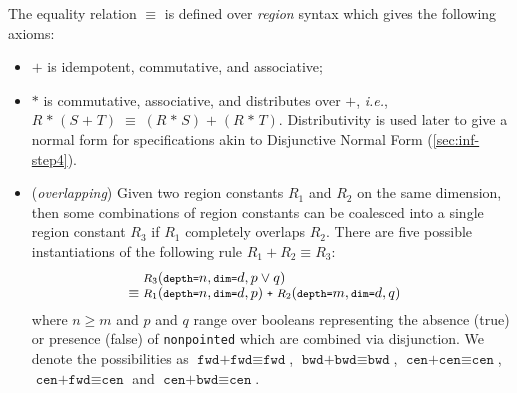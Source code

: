 \documentclass[10pt,preprint]{sigplanconf}
\theoremstyle{definition}
\newcommand{\ie}{\emph{i.e.}}
\newcommand{\term}[1]{\texttt{#1}}
\newcommand{\irrefl}{\texttt{nonpointed}}
\begin{document}
The equality relation $\equiv$ is defined over \emph{region}
syntax which gives the following axioms:
%
\begin{itemize}
\item $\term{+}$ is idempotent, commutative, and associative;
\item $\term{*}$ is commutative, associative, and distributes over
$\term{+}$, \ie{},  $R \; \texttt{*} \; (S \; \texttt{+} \; T) \; \equiv \; (R \;
                       \texttt{*} \; S) \; \texttt{+} \; (R
                       \; \texttt{*} \; T)$.
Distributivity is
used later to give a normal form for specifications
akin to Disjunctive Normal Form (\cref{sec:inf-step4}).

\item (\emph{overlapping}) Given two region constants $R_1$ and $R_2$
on the same dimension, then some combinations of region constants
can be coalesced into a single region constant $R_3$ if $R_1$ completely
overlaps $R_2$. There are five possible instantiations of the
following rule $R_1 + R_2 \equiv R_3$:
%
\newcommand{\stenGR}[4]{\small{\textit{#4}(\term{depth=}#1,
  \term{dim=}#2, #3)}}
\newcommand{\stenG}[3]{\small{\textit{#3}(\term{depth=}#1,
  \term{dim=}#2)}}
\begin{align*}
\hspace{-1em} & \stenGR{n}{d}{p \vee q}{$R_3$} \\[-0.4em]
\hspace{-1em} \equiv \; & \stenGR{n}{d}{p}{$R_1$} \; \texttt{+} \; \stenGR{m}{d}{q}{$R_2$}
\end{align*}
where $n \geq m$ and $p$ and $q$ range
over booleans representing the absence (true) or presence (false)
of \irrefl{} which are combined via disjunction.
We denote the possibilities as $\term{fwd+fwd} \equiv \term{fwd}$, $\term{bwd+bwd} \equiv \term{bwd}$,
$\term{cen+cen} \equiv \term{cen}$, $\term{cen+fwd} \equiv \term{cen}$ and
$\term{cen+bwd} \equiv \term{cen}$. %


\end{itemize}
\end{document}

